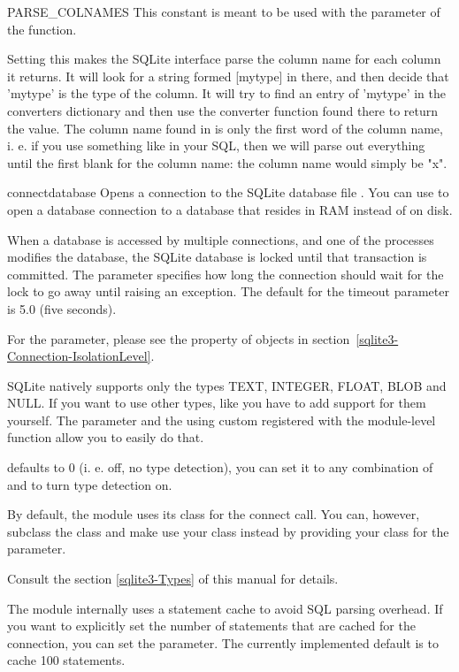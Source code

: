 \begin{datadesc}{PARSE_COLNAMES}
This constant is meant to be used with the  parameter of the
 function.

Setting this makes the SQLite interface parse the column name for each column
it returns.  It will look for a string formed [mytype] in there, and then
decide that 'mytype' is the type of the column. It will try to find an entry of
'mytype' in the converters dictionary and then use the converter function found
there to return the value. The column name found in  is only
the first word of the column name, i.  e. if you use something like
 in your SQL, then we will parse out everything until the
first blank for the column name: the column name would simply be "x".
\end{datadesc}

\begin{funcdesc}{connect}{database}
Opens a connection to the SQLite database file . You can use
 to open a database connection to a database that resides in
RAM instead of on disk.

When a database is accessed by multiple connections, and one of the processes
modifies the database, the SQLite database is locked until that transaction is
committed. The  parameter specifies how long the connection should
wait for the lock to go away until raising an exception. The default for the
timeout parameter is 5.0 (five seconds). 

For the  parameter, please see the 
property of  objects in section~\ref{sqlite3-Connection-IsolationLevel}.

SQLite natively supports only the types TEXT, INTEGER, FLOAT, BLOB and NULL. If
you want to use other types, like you have to add support for them yourself.
The  parameter and the using custom  registered with
the module-level  function allow you to easily do that.

 defaults to 0 (i. e. off, no type detection), you can set it
to any combination of  and  to turn type
detection on.

By default, the  module uses its  class for the
connect call.  You can, however, subclass the  class and make
 use your class instead by providing your class for the
 parameter.

Consult the section \ref{sqlite3-Types} of this manual for details.

The  module internally uses a statement cache to avoid SQL parsing
overhead. If you want to explicitly set the number of statements that are
cached for the connection, you can set the  parameter.
The currently implemented default is to cache 100 statements.
\end{funcdesc}

